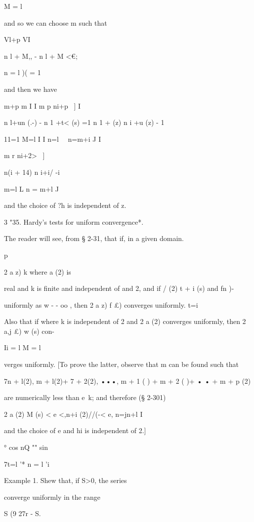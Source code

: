 M = l

and so we can choose m such that

Vl+p VI

n l + M,, - n l + M <€;

n = l )( = 1

and then we have

m+p m I I m p ni+p ~] I

n l+un (.-) - n 1 +t< (s) =1 n 1 + (z) n i +u (z) - 1

11=1 M=l I I n=l \ \ n=m+i J I

m r ni+2> ~]

 n(i + 14) n i+i/ -i

m=l L n = m+l J

and the choice of ?h is independent of z.

3 "35. Hardy's tests for uniform convergence*.



The reader will see, from § 2-31, that if, in a given domain.



p



2 a z) k where a (2) is



real and k is finite and independent of and 2, and if / (2) t + i (s)
and fn )-

uniformly as w - - oo , then 2 a z) f £) converges uniformly. t=i

Also that if where k is independent of 2 and 2 a (2) converges
uniformly, then 2 a,j £) w (s) con-

Ii = l M = l

verges uniformly. [To prove the latter, observe that m can be found
such that

 7n + l(2), m + l(2)+ 7 + 2(2), •••, m + 1 ( ) + m + 2 ( )+ • • + m +
p (2)

are numerically less than e\ k; and therefore (§ 2-301)

2 a (2) M (s) < e <,n+i (2)//(-< e, n=jn+l I

and the choice of e and hi is independent of 2.]



° cos nQ "" sin %

7t=l '* n = l 'i



Example 1. Shew that, if S>0, the series

converge uniformly in the range

S (9 27r - S.

